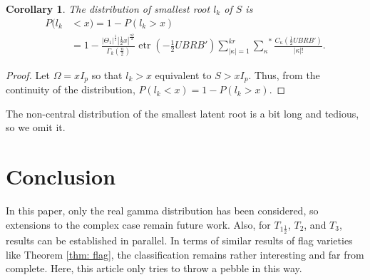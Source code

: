 \documentclass{amsart}
\newtheorem{corollary}[theorem]{Corollary}
\theoremstyle{definition}
\numberwithin{equation}{section}
\begin{document}
\begin{corollary} The distribution of smallest root $l_{k}$ of $S$ is 
	\[\begin{aligned} 
		P(l_{k} & < x) =  1 - P(l_{k} > x)  \\
        & = 1 - \frac{| \varTheta_{1}|^{\frac{1}{2}}|\frac{1}{2}x|^{\frac{nk}{2}}}{\varGamma_{k}(\frac{n}{2})}\operatorname{etr}\left(-\frac{1}{2} UBRB'\right) \sum_{|\kappa|=1}^{kr} {\sum_{\kappa}}^*\frac{C_{\kappa}\left(\frac{1}{2} UBRB'\right) }{|\kappa|!}.\end{aligned}\]
\end{corollary}
\begin{proof}
	Let $\Omega = xI_{p}$ so that $l_{k} > x$ equivalent to $S > xI_{p}$. Thus, from the continuity of the distribution, $P(l_{k} < x) =  1 - P(l_{k} > x)$.
\end{proof}
The non-central distribution of the smallest latent root is a bit long and tedious, so we omit it.






\section{Conclusion}

In this paper, only the real gamma distribution has been considered, so extensions to the complex case remain future work. Also, for $T_{1\frac{1}{2}}$, $T_{2}$, and $T_{3}$, results can be established in parallel. In terms of similar results of flag varieties like Theorem \ref{thm: flag}, the classification remains rather interesting and far from complete. Here, this article only tries to throw a pebble in this way.  
\end{document}
